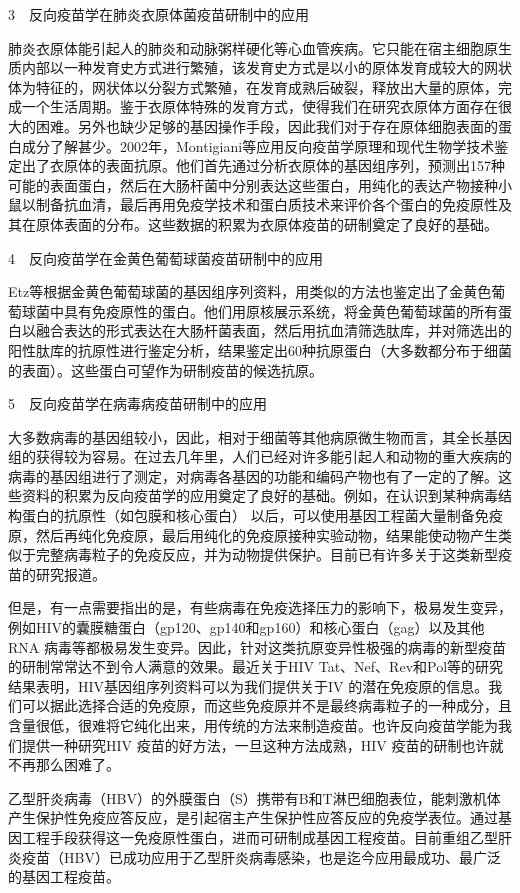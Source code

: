 3　反向疫苗学在肺炎衣原体菌疫苗研制中的应用

肺炎衣原体能引起人的肺炎和动脉粥样硬化等心血管疾病。它只能在宿主细胞原生质内部以一种发育史方式进行繁殖，该发育史方式是以小的原体发育成较大的网状体为特征的，网状体以分裂方式繁殖，在发育成熟后破裂，释放出大量的原体，完成一个生活周期。鉴于衣原体特殊的发育方式，使得我们在研究衣原体方面存在很大的困难。另外也缺少足够的基因操作手段，因此我们对于存在原体细胞表面的蛋白成分了解甚少。2002年，Montigiani等应用反向疫苗学原理和现代生物学技术鉴定出了衣原体的表面抗原。他们首先通过分析衣原体的基因组序列，预测出157种可能的表面蛋白，然后在大肠杆菌中分别表达这些蛋白，用纯化的表达产物接种小鼠以制备抗血清，最后再用免疫学技术和蛋白质技术来评价各个蛋白的免疫原性及其在原体表面的分布。这些数据的积累为衣原体疫苗的研制奠定了良好的基础。

4　反向疫苗学在金黄色葡萄球菌疫苗研制中的应用

Etz等根据金黄色葡萄球菌的基因组序列资料，用类似的方法也鉴定出了金黄色葡萄球菌中具有免疫原性的蛋白。他们用原核展示系统，将金黄色葡萄球菌的所有蛋白以融合表达的形式表达在大肠杆菌表面，然后用抗血清筛选肽库，并对筛选出的阳性肽库的抗原性进行鉴定分析，结果鉴定出60种抗原蛋白（大多数都分布于细菌的表面）。这些蛋白可望作为研制疫苗的候选抗原。

5　反向疫苗学在病毒病疫苗研制中的应用

大多数病毒的基因组较小，因此，相对于细菌等其他病原微生物而言，其全长基因组的获得较为容易。在过去几年里，人们已经对许多能引起人和动物的重大疾病的病毒的基因组进行了测定，对病毒各基因的功能和编码产物也有了一定的了解。这些资料的积累为反向疫苗学的应用奠定了良好的基础。例如，在认识到某种病毒结构蛋白的抗原性（如包膜和核心蛋白）
以后，可以使用基因工程菌大量制备免疫原，然后再纯化免疫原，最后用纯化的免疫原接种实验动物，结果能使动物产生类似于完整病毒粒子的免疫反应，并为动物提供保护。目前已有许多关于这类新型疫苗的研究报道。

但是，有一点需要指出的是，有些病毒在免疫选择压力的影响下，极易发生变异，例如HIV的囊膜糖蛋白（gp120、gp140和gp160）和核心蛋白（gag）以及其他RNA
病毒等都极易发生变异。因此，针对这类抗原变异性极强的病毒的新型疫苗的研制常常达不到令人满意的效果。最近关于HIV
Tat、Nef、Rev和Pol等的研究结果表明，HIV基因组序列资料可以为我们提供关于IV
的潜在免疫原的信息。我们可以据此选择合适的免疫原，而这些免疫原并不是最终病毒粒子的一种成分，且含量很低，很难将它纯化出来，用传统的方法来制造疫苗。也许反向疫苗学能为我们提供一种研究HIV
疫苗的好方法，一旦这种方法成熟，HIV 疫苗的研制也许就不再那么困难了。

乙型肝炎病毒（HBV）的外膜蛋白（S）携带有B和T淋巴细胞表位，能刺激机体产生保护性免疫应答反应，是引起宿主产生保护性应答反应的免疫学表位。通过基因工程手段获得这一免疫原性蛋白，进而可研制成基因工程疫苗。目前重组乙型肝炎疫苗（HBV）已成功应用于乙型肝炎病毒感染，也是迄今应用最成功、最广泛的基因工程疫苗。

